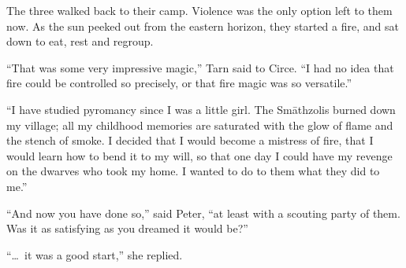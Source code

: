The three walked back to their camp.  Violence was the only option left to them now.  As the sun peeked out from the eastern horizon, they started a fire, and sat down to eat, rest and regroup.

``That was some very impressive magic,'' Tarn said to Circe.  ``I had no idea that fire could be controlled so precisely, or that fire magic was so versatile.''

``I have studied pyromancy since I was a little girl.  The Sm\=athzolis burned down my village; all my childhood memories are saturated with the glow of flame and the stench of smoke.  I decided that I would become a mistress of fire, that I would learn how to bend it to my will, so that one day I could have my revenge on the dwarves who took my home.  I wanted to do to them what they did to me.''

``And now you have done so,'' said Peter, ``at least with a scouting party of them.  Was it as satisfying as you dreamed it would be?''

``\ldots\ it was a good start,'' she replied.




